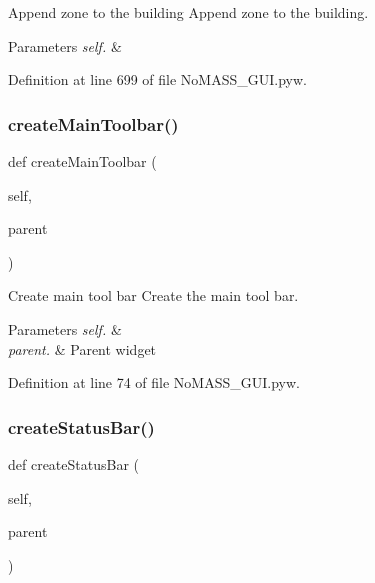 Append zone to the building Append zone to the building. 


\begin{DoxyParams}{Parameters}
{\em self.} & \\
\hline
\end{DoxyParams}


Definition at line 699 of file No\+M\+A\+S\+S\+\_\+\+G\+U\+I.\+pyw.

\mbox{\label{class_no_m_a_s_s___g_u_i_1_1_app_aa2c521b1919bad17bbd98c40cf56a7d4}} 
\subsubsection{\texorpdfstring{create\+Main\+Toolbar()}{createMainToolbar()}}
{\footnotesize\ttfamily def create\+Main\+Toolbar (\begin{DoxyParamCaption}\item[{}]{self,  }\item[{}]{parent }\end{DoxyParamCaption})}



Create main tool bar Create the main tool bar. 


\begin{DoxyParams}{Parameters}
{\em self.} & \\
\hline
{\em parent.} & Parent widget \\
\hline
\end{DoxyParams}


Definition at line 74 of file No\+M\+A\+S\+S\+\_\+\+G\+U\+I.\+pyw.

\mbox{\label{class_no_m_a_s_s___g_u_i_1_1_app_ab88dd8d1817c2c1026001f3aa25ac355}} 
\subsubsection{\texorpdfstring{create\+Status\+Bar()}{createStatusBar()}}
{\footnotesize\ttfamily def create\+Status\+Bar (\begin{DoxyParamCaption}\item[{}]{self,  }\item[{}]{parent }\end{DoxyParamCaption})}



